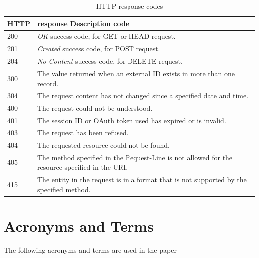 \documentclass[10pt]{article}
\begin{document}
\begin{table}[!h]
\caption{HTTP response codes}
\begin{tabular}{p{1cm}p{15cm}}
HTTP & response Description code \\
\hline
200 & {\it OK} success code, for GET or HEAD request. \\
201 & {\it Created} success code, for POST request. \\
204 & {\it No Content} success code, for DELETE request. \\
300 & The value returned when an external ID exists in more than one
      record. \\
304 & The request content has not changed since a specified date and
      time. \\
400 & The request could not be understood. \\
401 & The session ID or OAuth token used has expired or is invalid. \\
403 & The request has been refused. \\
404 & The requested resource could not be found. \\
405 & The method specified in the Request-Line is not allowed for the
      resource specified in the URI. \\
415 & The entity in the request is in a format that is not supported by
      the specified method. \\
\end{tabular}
\end{table}




\clearpage
\newpage

\section{Acronyms and Terms}

The following acronyms and terms are used in the paper
\end{document}
